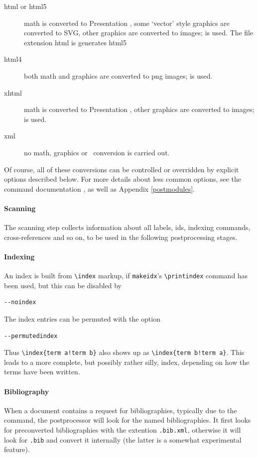 \documentclass{book}
\newcommand{\shellcode}{\lstinline[style=shell]}
\begin{document}
\begin{description}
 \item[html or html5] math is converted to Presentation \MathML,
     some `vector' style graphics are converted to SVG,
     other graphics are converted to images;
      is used.
     The file extension html is generates html5
 \item[html4] both math and graphics are converted to png images;
     is used.
 \item[xhtml] math is converted to Presentation \MathML, other graphics are converted to images;
       is used.
 \item[xml] no math, graphics or \XSLT\ conversion is carried out.
\end{description}
Of course, all of these conversions can be controlled or overridden
by explicit options described below.
For more details about less common options, see the command
documentation , as well as Appendix \ref{postmodules}.

\paragraph{Scanning}\label{usage.post.scanning}
The scanning step collects information about all labels, ids,
indexing commands, cross-references and so on, to be used
in the following postprocessing stages.

\paragraph{Indexing}\label{usage.post.indexing}
An index is built from \verb|\index| markup, if
\shellcode{makeidx}'s \verb|\printindex| command has been used,
but this can be disabled by
\begin{lstlisting}[style=shell]
--noindex
\end{lstlisting}
The index entries can be permuted with the option
\begin{lstlisting}[style=shell]
--permutedindex
\end{lstlisting}
Thus \verb|\index{term a!term b}| also shows up as \verb|\index{term b!term a}|.
This leads to a more complete, but possibly rather silly, index,
depending on how the terms have been written.

\paragraph{Bibliography}\label{usage.post.bibtex}
When a document contains a request for bibliographies,
typically due to the \verb|| command,
the postprocessor will look for the named bibliographies.
It first looks for preconverted bibliographies with the
extention \verb|.bib.xml|, otherwise it will look
for \verb|.bib| and convert it internally (the latter
is a somewhat experimental feature).
\end{document}
